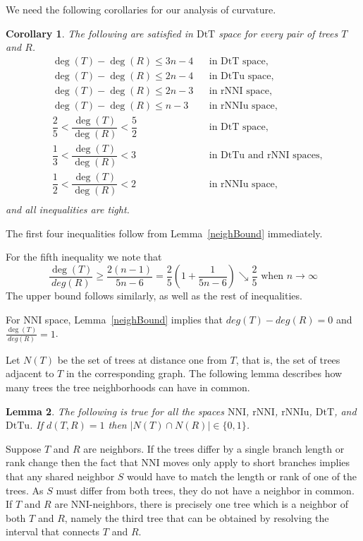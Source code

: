\documentclass{amsart}
\newtheorem{lemma}{Lemma}
\newtheorem{corollary}[lemma]{Corollary}
\theoremstyle{definition}
\newcommand{\nni}{\mathrm{NNI}}
\newcommand{\rnni}{\mathrm{rNNI}}
\newcommand{\rnniu}{\mathrm{rNNIu}}
\newcommand{\dtt}{\mathrm{DtT}}
\newcommand{\dttu}{\mathrm{DtTu}}
\begin{document}
We need the following corollaries for our analysis of curvature.

\begin{corollary}\label{degreeBounds}
The following are satisfied in $\dtt$ space for every pair of trees $T$ and $R$.
\begin{align*}
& \deg(T)-\deg(R) \leq 3n-4		&& \mbox{in $\dtt$ space,}\\
& \deg(T)-\deg(R) \leq 2n-4		&& \mbox{in $\dttu$ space,}\\
& \deg(T)-\deg(R) \leq 2n-3		&& \mbox{in $\rnni$ space,}\\
& \deg(T)-\deg(R) \leq n-3			&& \mbox{in $\rnniu$ space,}\\
& \dfrac25 < \dfrac{\deg(T)}{\deg(R)} < \dfrac52		&& \mbox{in $\dtt$ space,}\\
& \dfrac13 < \dfrac{\deg(T)}{\deg(R)} < 3			&& \mbox{in $\dttu$ and $\rnni$ spaces,}\\
& \dfrac12 < \dfrac{\deg(T)}{\deg(R)} < 2			&& \mbox{in $\rnniu$ space,}\\
\end{align*}
and all inequalities are tight.
\end{corollary}

\proof
The first four inequalities follow from Lemma~\ref{neighBound} immediately.

For the fifth inequality we note that
\[
\frac{\deg(T)}{deg(R)} \geq \frac{2(n-1)}{5n-6} = \frac25 \left(1 + \frac{1}{5n-6}\right) \searrow \frac 25 \mbox{ when } n\to\infty
\]
The upper bound follows similarly, as well as the rest of inequalities.
\endproof

For $\nni$ space, Lemma~\ref{neighBound} implies that $deg(T)-deg(R) = 0$ and $\frac{\deg(T)}{deg(R)} = 1$.

Let $N(T)$ be the set of trees at distance one from $T$, that is, the set of trees adjacent to $T$ in the corresponding graph.
The following lemma describes how many trees the tree neighborhoods can have in common.

\begin{lemma}\label{intersecNeighb}
The following is true for all the spaces $\nni$, $\rnni$, $\rnniu$, $\dtt$, and $\dttu$.
If $d(T,R) = 1$ then $|N(T)\cap N(R)|\in\{0,1\}$.
\end{lemma}

\proof
Suppose $T$ and $R$ are neighbors.
If the trees differ by a single branch length or rank change then the fact that NNI moves only apply to short branches implies that any shared neighbor $S$ would have to match the length or rank of one of the trees.
As $S$ must differ from both trees, they do not have a neighbor in common.
If $T$ and $R$ are NNI-neighbors, there is precisely one tree which is a neighbor of both $T$ and $R$, namely the third tree that can be obtained by resolving the interval that connects $T$ and $R$.
\endproof
\end{document}
